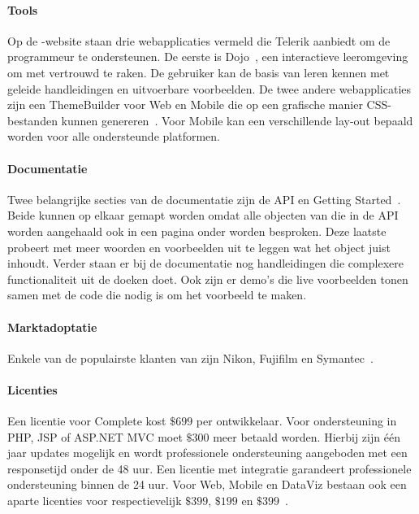 \paragraph{Tools}
Op de \kendo{}-website staan drie webapplicaties vermeld die Telerik aanbiedt om de programmeur te ondersteunen.
De eerste is \kendo{} Dojo~\cite{Telerika},  een interactieve leeromgeving om met \kendo{} vertrouwd te raken.
De gebruiker kan de basis van \kendo{} leren kennen met geleide handleidingen en uitvoerbare voorbeelden.
De twee andere webapplicaties zijn een ThemeBuilder voor Web en Mobile die op een grafische manier CSS-bestanden kunnen genereren~\cite{Telerikb,Telerikc}.
Voor \kendo{} Mobile kan een verschillende lay-out bepaald worden voor alle ondersteunde platformen.

\paragraph{Documentatie}
Twee belangrijke secties van de documentatie zijn de API en Getting Started~\cite{Telerikd}.
Beide kunnen op elkaar gemapt worden omdat alle objecten van \kendo{} die in de API worden aangehaald ook in een pagina onder  worden besproken.
Deze laatste probeert met meer woorden en voorbeelden uit te leggen wat het object juist inhoudt.
Verder staan er bij de documentatie nog handleidingen die complexere functionaliteit uit de doeken doet.
Ook zijn er demo's die live voorbeelden tonen samen met de code die nodig is om het voorbeeld te maken.

\paragraph{Marktadoptatie}
Enkele van de populairste klanten van \kendo{} zijn Nikon,  Fujifilm en Symantec~\cite{Telerike}.

\paragraph{Licenties}
Een licentie voor \kendo{} Complete kost $\$699$ per ontwikkelaar.
Voor ondersteuning in PHP,  JSP of ASP.NET MVC moet $\$300$ meer betaald worden.
Hierbij zijn één jaar updates mogelijk en wordt professionele ondersteuning aangeboden met een responsetijd onder de 48 uur.
Een licentie met integratie garandeert professionele ondersteuning binnen de 24 uur.
Voor \kendo{} Web,  Mobile en DataViz bestaan ook een aparte licenties voor respectievelijk $\$399$,  $\$199$ en $\$399$~\cite{Telerike}.

